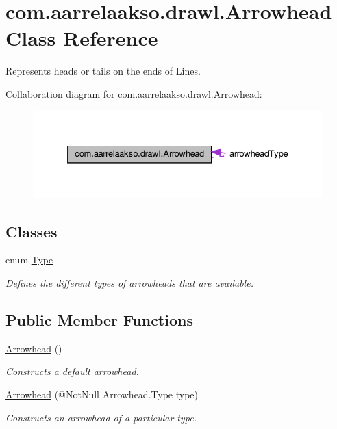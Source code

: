 \hypertarget{classcom_1_1aarrelaakso_1_1drawl_1_1_arrowhead}{}\section{com.\+aarrelaakso.\+drawl.\+Arrowhead Class Reference}
\label{classcom_1_1aarrelaakso_1_1drawl_1_1_arrowhead}


Represents heads or tails on the ends of Lines.  




Collaboration diagram for com.\+aarrelaakso.\+drawl.\+Arrowhead\+:\nopagebreak
\begin{figure}[H]
\begin{center}
\leavevmode
\includegraphics[width=332pt]{d2/db3/classcom_1_1aarrelaakso_1_1drawl_1_1_arrowhead__coll__graph}
\end{center}
\end{figure}
\subsection*{Classes}
\begin{DoxyCompactItemize}
\item 
enum \hyperlink{enumcom_1_1aarrelaakso_1_1drawl_1_1_arrowhead_1_1_type}{Type}
\begin{DoxyCompactList}\small\item\em Defines the different types of arrowheads that are available. \end{DoxyCompactList}\end{DoxyCompactItemize}
\subsection*{Public Member Functions}
\begin{DoxyCompactItemize}
\item 
\hyperlink{classcom_1_1aarrelaakso_1_1drawl_1_1_arrowhead_a866fb3900ad67226bad5962031cc7817}{Arrowhead} ()
\begin{DoxyCompactList}\small\item\em Constructs a default arrowhead. \end{DoxyCompactList}\item 
\hyperlink{classcom_1_1aarrelaakso_1_1drawl_1_1_arrowhead_a43464dd3355fda0d6e295d4282433828}{Arrowhead} (@Not\+Null Arrowhead.\+Type type)
\begin{DoxyCompactList}\small\item\em Constructs an arrowhead of a particular type. \end{DoxyCompactList}\end{DoxyCompactItemize}
